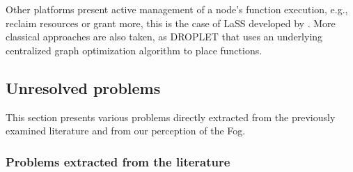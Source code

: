 Other platforms present active management of a node's function execution, e.g., reclaim resources or grant more, this is the case of \gls{LaSS} developed by \citet{wang_lass_2021}. More classical approaches are also taken, as  DROPLET that uses an underlying centralized graph optimization algorithm to place functions.

\subsection{Unresolved problems}
\label{sec:curated}

This section presents various problems directly extracted from the previously examined literature and from our perception of the Fog.

\subsubsection{Problems extracted from the literature}

